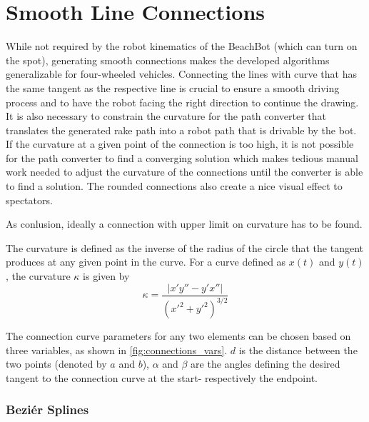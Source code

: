 \section{Smooth Line Connections}

While not required by the robot kinematics of the BeachBot (which can turn on the spot), generating smooth connections 
makes the developed algorithms generalizable for four-wheeled vehicles. Connecting the lines with curve that has the same tangent as the respective line is crucial to ensure a smooth driving process and to have the robot facing the right direction to continue the drawing.
It is also necessary to constrain the curvature for the path converter that translates the generated rake path into a robot path that is drivable by the bot. If the curvature at a given point of the connection is too high, it is not possible for the path converter to find a converging solution which makes tedious manual work needed to adjust the curvature of the connections until the converter is able to find a solution. The rounded connections also create a nice visual effect to spectators.

As conlusion, ideally a connection with upper limit on curvature has to be found.

The curvature is defined as the inverse of the radius of the circle that the tangent produces at any given point in the curve. For a curve defined as $x(t)$ and $y(t)$, the curvature $\kappa$ is given by
\begin{equation}
\kappa = \frac{|x'y''-y'x''|}{(x'^2+y'^2)^{3/2}}
\end{equation}

The connection curve parameters for any two elements can be chosen based on three variables, as shown in \autoref{fig:connections_vars}. $d$ is the distance between the two points (denoted by $a$ and $b$), $\alpha$ and $\beta$ are the angles defining the desired tangent to the connection curve at the start- respectively the endpoint.



\subsubsection{Beziér Splines}

